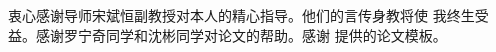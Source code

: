 \begin{acknowledgement}
  衷心感谢导师宋斌恒副教授对本人的精心指导。他们的言传身教将使
  我终生受益。感谢罗宁奇同学和沈彬同学对论文的帮助。感谢 \thuthesis 提供的论文模板。
\end{acknowledgement}
